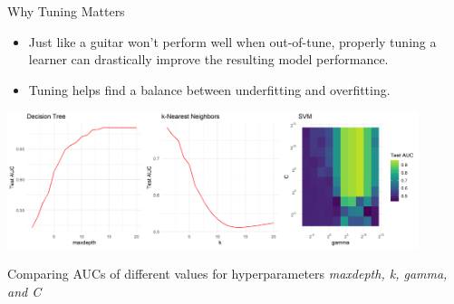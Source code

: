 \documentclass[11pt,compress,t,notes=noshow, xcolor=table]{beamer}
\begin{document}
\begin{vbframe}{Why Tuning Matters}
\begin{itemize}
\item \small Just like a guitar won't perform well when out-of-tune, properly tuning a learner can drastically improve the resulting model performance.
\item \small Tuning helps find a balance between underfitting and overfitting.
\end{itemize}

\begin{center}
\vspace{2em}
\includegraphics[width = 0.9\textwidth]{figure/tuning_importance.png}
\end{center}
\vspace{1em}
\begin{center}
\scriptsize Comparing AUCs of different values for hyperparameters \textit{maxdepth, k, gamma, and C}
\end{center}

\end{vbframe}
\end{document}
